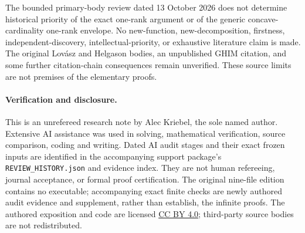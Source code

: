 \documentclass[11pt]{article}
\begin{document}
The bounded primary-body review dated 13 October 2026 does not determine historical priority of the exact one-rank argument or of the generic concave-cardinality one-rank envelope. No new-function, new-decomposition, firstness, independent-discovery, intellectual-priority, or exhaustive literature claim is made. The original Lov\'asz and Helgason bodies, an unpublished GHIM citation, and some further citation-chain consequences remain unverified. These source limits are not premises of the elementary proofs.

\paragraph{Verification and disclosure.}
This is an unrefereed research note by Alec Kriebel, the sole named author. Extensive AI assistance was used in solving, mathematical verification, source comparison, coding and writing. Dated AI audit stages and their exact frozen inputs are identified in the accompanying support package's \texttt{REVIEW\_HISTORY.json} and evidence index. They are not human refereeing, journal acceptance, or formal proof certification. The original nine-file edition contains no executable; accompanying exact finite checks are newly authored audit evidence and supplement, rather than establish, the infinite proofs. The authored exposition and code are licensed \href{https://creativecommons.org/licenses/by/4.0/}{CC BY 4.0}; third-party source bodies are not redistributed.
\end{document}
